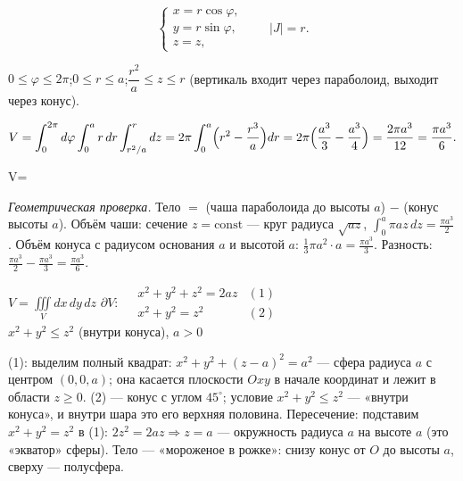 \[
\begin{cases}x=r\cos\varphi,\\ y=r\sin\varphi,\\ z=z,\end{cases}\qquad |J|=r .
\]

$0\leqslant\varphi\leqslant2\pi$;\quad $0\leqslant r\leqslant a$;\quad $\dfrac{r^2}{a}\leqslant z\leqslant r$ (вертикаль входит через параболоид, выходит через конус).

\[
V=\int_0^{2\pi}d\varphi\int_0^a r\,dr\int_{r^2/a}^{r}dz=2\pi\int_0^a\Bigl(r^2-\frac{r^3}{a}\Bigr)dr=2\pi\Bigl(\frac{a^3}{3}-\frac{a^3}{4}\Bigr)=\frac{2\pi a^3}{12}=\frac{\pi a^3}{6}.
\]

\begin{answerbox}
V=
\end{answerbox}

\emph{Геометрическая проверка.} Тело $=$ (чаша параболоида до высоты $a$) $-$ (конус высоты $a$). Объём чаши: сечение $z=\mathrm{const}$ --- круг радиуса $\sqrt{az}$, $\int_0^a\pi az\,dz=\frac{\pi a^3}{2}$. Объём конуса с радиусом основания $a$ и высотой $a$: $\frac13\pi a^2\cdot a=\frac{\pi a^3}{3}$. Разность: $\frac{\pi a^3}{2}-\frac{\pi a^3}{3}=\frac{\pi a^3}{6}$. \checkmark


\begin{shapka}
$\displaystyle V=\iiint\limits_{V}dx\,dy\,dz$
\tcblower
$\partial V:\quad
\begin{array}{ll}
x^2+y^2+z^2=2az & (1)\\
x^2+y^2=z^2 & (2)
\end{array}$\\[1mm]
$x^2+y^2\leqslant z^2$ (внутри конуса), $a>0$
\end{shapka}

(1): выделим полный квадрат: $x^2+y^2+(z-a)^2=a^2$ --- сфера радиуса $a$ с центром $(0,0,a)$; она касается плоскости $Oxy$ в начале координат и лежит в области $z\geqslant0$. (2) --- конус с углом $45^\circ$; условие $x^2+y^2\leqslant z^2$ --- «внутри конуса», и внутри шара это его верхняя половина.
Пересечение: подставим $x^2+y^2=z^2$ в (1): $2z^2=2az\Rightarrow z=a$ --- окружность радиуса $a$ на высоте $a$ (это «экватор» сферы). Тело --- «мороженое в рожке»: снизу конус от $O$ до высоты $a$, сверху --- полусфера.

